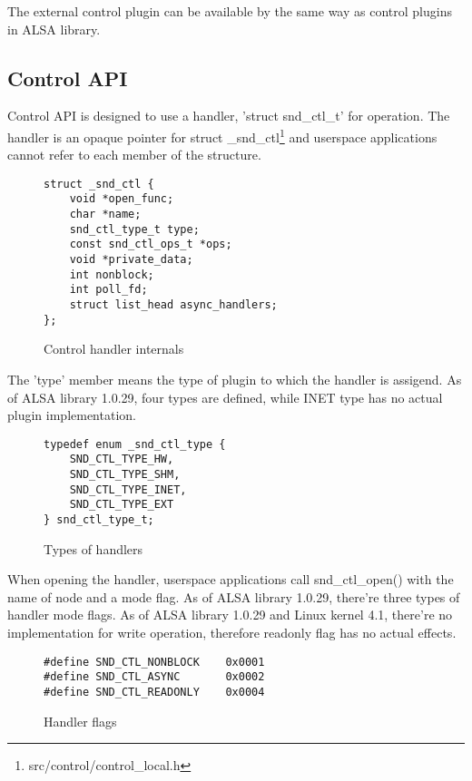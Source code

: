 \documentclass[onecolumn]{article}
\begin{document}
The external control plugin can be available by the same way as control plugins in ALSA library.


\subsection{Control API}

Control API is designed to use a handler, 'struct snd\_ctl\_t' for operation. The handler is an opaque pointer for struct \_snd\_ctl\footnote{src/control/control\_local.h} and userspace applications cannot refer to each member of the structure.

\begin{figure}[htbp]
\small
\begin{verbatim}
struct _snd_ctl {
    void *open_func;
    char *name;
    snd_ctl_type_t type;
    const snd_ctl_ops_t *ops;
    void *private_data;
    int nonblock;
    int poll_fd;
    struct list_head async_handlers;
};
\end{verbatim}
\caption{{Control handler internals}}
\label{control-handler-internals}
\end{figure}

The 'type' member means the type of plugin to which the handler is assigend. As of ALSA library 1.0.29, four types are defined, while INET type has no actual plugin implementation.

\begin{figure}[htbp]
\small
\begin{verbatim}
typedef enum _snd_ctl_type {
    SND_CTL_TYPE_HW,
    SND_CTL_TYPE_SHM,
    SND_CTL_TYPE_INET,
    SND_CTL_TYPE_EXT
} snd_ctl_type_t;
\end{verbatim}
\caption{{Types of handlers}}
\label{snd-ctl-type-t}
\end{figure}

When opening the handler, userspace applications call snd\_ctl\_open() with the name of node and a mode flag. As of ALSA library 1.0.29, there're three types of handler mode flags. As of ALSA library 1.0.29 and Linux kernel 4.1, there're no implementation for write operation, therefore readonly flag has no actual effects.

\begin{figure}[htbp]
\small
\begin{verbatim}
#define SND_CTL_NONBLOCK    0x0001
#define SND_CTL_ASYNC       0x0002
#define SND_CTL_READONLY    0x0004
\end{verbatim}
\caption{{Handler flags}}
\label{handler-flags}
\end{figure}
\end{document}
